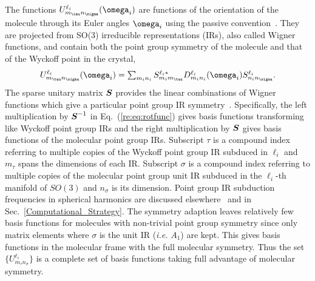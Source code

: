 \documentclass[preprint]{iucr}              %
\newcommand{\mb}[1]{\ensuremath{\mbox{\boldmath $ #1 $}}}
\begin{document}
The functions $U^{\ell_i}_{m_\tau n_\sigma}(\mb{\omega}_i)$ are functions of the
orientation of the molecule through its Euler angles $\mb{\omega}_i$
using the passive convention~\cite{Varshalovich88}.  They are
projected from SO(3) irreducible representations (IRs), also called
Wigner functions, and contain both the point group symmetry of the
molecule and that of the Wyckoff point in the crystal,
\begin{equation}
\label{re:eq:rotfunc}U^{\ell_i}_{m_\tau
n_\sigma}(\mb{\omega}_i)=\sum_{m_i n_i}S^{\ell_i*}_{m_im_\tau}D_{m_i
n_i}^{\ell_i}(\mb{\omega}_i)S^{\ell_i}_{n_in_\sigma}.
\end{equation}
The sparse unitary matrix $\mb{S}$ provides the linear combinations
of Wigner functions which give a particular point group IR
symmetry~\cite{Bradley72}.  Specifically, the left multiplication by
$\mb{S}^{-1}$ in Eq.~(\ref{re:eq:rotfunc}) gives basis functions
transforming like Wyckoff point group IRs and the right
multiplication by $\mb{S}$ gives basis functions of the molecular
point group IRs. Subscript $\tau$ is a compound index referring to
multiple copies of the Wyckoff point group IR subduced in $\ell_i$
and $m_\tau$ spans the dimensions of each IR. Subscript $\sigma$
is a compound index referring to multiple copies of the molecular
point group unit IR subduced in the $\ell_i$-th manifold of $SO(3)$
and $n_\sigma$ is its dimension. Point group IR subduction
frequencies in spherical harmonics are discussed
elsewhere~\cite{Bradley72} and in Sec.~\ref{Computational_Strategy}.
The symmetry adaption leaves relatively few basis functions for molecules with non-trivial point group symmetry since
only matrix elements where $\sigma$ is the unit IR (\emph{i.e.}
$A_1$) are kept.  This gives basis functions in the molecular frame
with the full molecular symmetry.  Thus the set
$\{U^{\ell_i}_{m_\tau n_\sigma}\}$ is a complete set of basis functions
taking full advantage of molecular symmetry.
\end{document}

